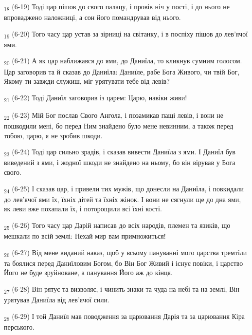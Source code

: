 \begin{tcolorbox}
\textsubscript{18} (6-19) Тоді цар пішов до свого палацу, і провів ніч у пості, і до нього не впроваджено наложниці, а сон його помандрував від нього.
\end{tcolorbox}
\begin{tcolorbox}
\textsubscript{19} (6-20) Того часу цар устав за зірниці на світанку, і в поспіху пішов до лев'ячої ями.
\end{tcolorbox}
\begin{tcolorbox}
\textsubscript{20} (6-21) А як цар наближався до ями, до Даниїла, то кликнув сумним голосом. Цар заговорив та й сказав до Даниїла: Даниїле, рабе Бога Живого, чи твій Бог, Якому ти завжди служиш, міг урятувати тебе від левів?
\end{tcolorbox}
\begin{tcolorbox}
\textsubscript{21} (6-22) Тоді Даниїл заговорив із царем: Царю, навіки живи!
\end{tcolorbox}
\begin{tcolorbox}
\textsubscript{22} (6-23) Мій Бог послав Свого Ангола, і позамикав пащі левів, і вони не пошкодили мені, бо перед Ним знайдено було мене невинним, а також перед тобою, царю, я не зробив шкоди.
\end{tcolorbox}
\begin{tcolorbox}
\textsubscript{23} (6-24) Тоді цар сильно зрадів, і сказав вивести Даниїла з ями. І Даниїл був виведений з ями, і жодної шкоди не знайдено на ньому, бо він вірував у Бога свого.
\end{tcolorbox}
\begin{tcolorbox}
\textsubscript{24} (6-25) І сказав цар, і привели тих мужів, що донесли на Даниїла, і повкидали до лев'ячої ями їх, їхніх дітей та їхніх жінок. І вони не сягнули ще до дна ями, як леви вже похапали їх, і поторощили всі їхні кості.
\end{tcolorbox}
\begin{tcolorbox}
\textsubscript{25} (6-26) Того часу цар Дарій написав до всіх народів, племен та язиків, що мешкали по всій землі: Нехай мир вам примножиться!
\end{tcolorbox}
\begin{tcolorbox}
\textsubscript{26} (6-27) Від мене виданий наказ, щоб у всьому пануванні мого царства тремтіли та боялися перед Даниїловим Богом, бо Він Бог Живий і існує повіки, і царство Його не буде зруйноване, а панування Його аж до кінця.
\end{tcolorbox}
\begin{tcolorbox}
\textsubscript{27} (6-28) Він рятує та визволяє, і чинить знаки та чуда на небі та на землі, Він урятував Даниїла від лев'ячої сили.
\end{tcolorbox}
\begin{tcolorbox}
\textsubscript{28} (6-29) І той Даниїл мав поводження за царювання Дарія та за царювання Кіра перського.
\end{tcolorbox}
